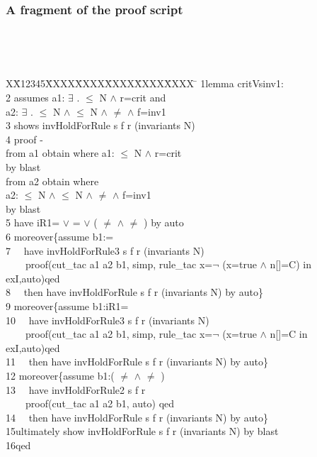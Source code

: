 \documentclass{beamer}
\newlength{\fminilength}
\newenvironment{fmini}[1][\linewidth]
  {\setlength{\fminilength}{#1\fboxsep-2\fboxrule}%
   \vspace{2ex}\noindent\begin{lrbox}{\fminibox}\begin{minipage}{\fminilength}%
   \mbox{ }\hfill\vspace{-2.5ex}}%
  {\end{minipage}\end{lrbox}\vspace{1ex}\hspace{0ex}%
   \framebox{\usebox{\fminibox}}}
\newenvironment{specification}
{\noindent\scriptsize
\tt\begin{fmini}\begin{tabbing}X\=X12345\=XXXX\=XXXX\=XXXX\=XXXX\=XXXX
\=\+\kill} {\end{tabbing}\normalfont\end{fmini}}
\def \twoSpaces {\ \ }
\def \andc {\wedge }
\def \negc {\neg }
\begin{document}
\begin{frame}\frametitle{ A fragment of the proof script}
\begin{specification}
1lemma critVsinv1:\\
2  assumes  a1: $\exists$ .  $\le$ N $\wedge$ r=crit  and \\
  a2: $\exists$   .  $\le$ N $\wedge$  $\le$ N $\wedge$  $\neq$  $\wedge$ f=inv1   \\
3  shows  invHoldForRule s f r (invariants
  N)\\
4  proof -\\
   from a1 obtain  where a1: $\le$ N $\wedge$ r=crit  \\
   by blast\\
   from a2 obtain   where \\
   a2:  $\le$ N $\wedge$  $\le$ N $\wedge$  $\neq$  $\wedge$ f=inv1   \\
   by blast \\
5  have iR1= $\vee$ = $\vee$ ( $\ne$  $\wedge$   $\ne$ ) by auto\\

6  moreover\{assume  b1:=\\
7  \twoSpaces have invHoldForRule3 s f r (invariants N)\\
 \twoSpaces  \twoSpaces   proof(cut\_tac a1 a2 b1, simp, rule\_tac x=$\negc$ (x=true $\andc$ n[]=C)  in exI,auto)qed\\
8  \twoSpaces then have invHoldForRule s f r
(invariants
  N)
by auto\}\\

9  moreover\{assume  b1:iR1=\\
10 \twoSpaces have invHoldForRule3 s f r (invariants N)\\
 \twoSpaces \twoSpaces   proof(cut\_tac a1 a2 b1, simp, rule\_tac x=$\negc$ (x=true $\andc$ n[]=C  in exI,auto)qed\\
11 \twoSpaces then have invHoldForRule s f r (invariants
  N)
by auto\}\\

12   moreover\{assume  b1:( $\ne$   $\wedge$    $\ne$  )\\
13 \twoSpaces have invHoldForRule2 s f r  \\
  \twoSpaces \twoSpaces  proof(cut\_tac a1 a2 b1,  auto) qed\\
14 \twoSpaces then have invHoldForRule s f r
(invariants
  N)
by auto\} \\

15ultimately show invHoldForRule s f r
(invariants N) by blast\\
16qed\\
\end{specification}

 \end{frame}
\end{document}
